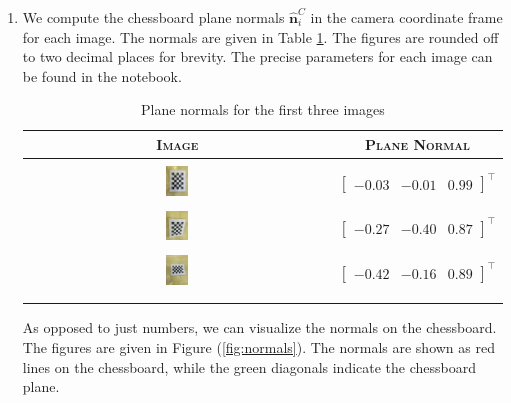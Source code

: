 \documentclass[10pt]{article}
\newcommand{\figref}[1]{Figure (\ref{fig:#1})}
\begin{document}
\begin{enumerate}
        \item We compute the chessboard plane normals $\mathbf{\hat{n}}_{i}^{C}$ in the
        camera coordinate frame for each image. The normals are given in Table
        \ref{tab:plane-normals}. The figures are rounded off to two decimal places for
        brevity. The precise parameters for each image can be found in the notebook.
        \begin{longtable}{c|c}
            \textsc{Image} & \textsc{Plane Normal} \\
            \hline & \\
            \includegraphics[width=0.075\textwidth, valign=c]{Assets/Camera-Calibration/01.jpg}
            & $\begin{bmatrix} -0.03 & -0.01 & 0.99 \end{bmatrix}^{\top}$ \\
            & \\
            \includegraphics[width=0.075\textwidth, valign=c]{Assets/Camera-Calibration/02.jpg}
            & $\begin{bmatrix} -0.27 & -0.40 & 0.87 \end{bmatrix}^{\top}$ \\
            & \\
            \includegraphics[width=0.075\textwidth, valign=c]{Assets/Camera-Calibration/03.jpg}
            & $\begin{bmatrix} -0.42 & -0.16 & 0.89 \end{bmatrix}^{\top}$ \\
            & \\
            \caption{Plane normals for the first three images}
            \label{tab:plane-normals}
        \end{longtable}
        As opposed to just numbers, we can visualize the normals on the chessboard. The
        figures are given in \figref{normals}. The normals are shown as red lines on the
        chessboard, while the green diagonals indicate the chessboard plane.

\end{enumerate}
\end{document}
